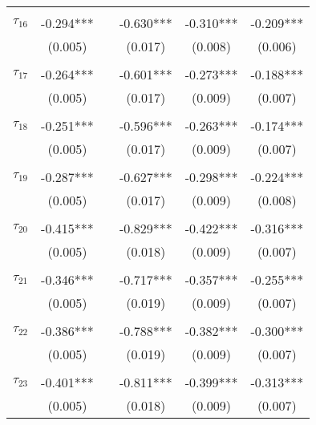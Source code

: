 \begin{tabular}{@{\extracolsep{-5pt}}lccccc}
                &           &&           &           &           \\[-2.1ex]
$\tau_{16}$     & -0.294*** && -0.630*** & -0.310*** & -0.209*** \\
                &  (0.005)  &&  (0.017)  &  (0.008)  &  (0.006)  \\
                &           &&           &           &           \\[-2.1ex]
$\tau_{17}$     & -0.264*** && -0.601*** & -0.273*** & -0.188*** \\
                &  (0.005)  &&  (0.017)  &  (0.009)  &  (0.007)  \\
                &           &&           &           &           \\[-2.1ex]
$\tau_{18}$     & -0.251*** && -0.596*** & -0.263*** & -0.174*** \\
                &  (0.005)  &&  (0.017)  &  (0.009)  &  (0.007)  \\
                &           &&           &           &           \\[-2.1ex]
$\tau_{19}$     & -0.287*** && -0.627*** & -0.298*** & -0.224*** \\
                &  (0.005)  &&  (0.017)  &  (0.009)  &  (0.008)  \\
                &           &&           &           &           \\[-2.1ex]
$\tau_{20}$     & -0.415*** && -0.829*** & -0.422*** & -0.316*** \\
                &  (0.005)  &&  (0.018)  &  (0.009)  &  (0.007)  \\
                &           &&           &           &           \\[-2.1ex]
$\tau_{21}$     & -0.346*** && -0.717*** & -0.357*** & -0.255*** \\
                &  (0.005)  &&  (0.019)  &  (0.009)  &  (0.007)  \\
                &           &&           &           &           \\[-2.1ex]
$\tau_{22}$     & -0.386*** && -0.788*** & -0.382*** & -0.300*** \\
                &  (0.005)  &&  (0.019)  &  (0.009)  &  (0.007)  \\
                &           &&           &           &           \\[-2.1ex]
$\tau_{23}$     & -0.401*** && -0.811*** & -0.399*** & -0.313*** \\
                &  (0.005)  &&  (0.018)  &  (0.009)  &  (0.007)  \\

\end{tabular}
